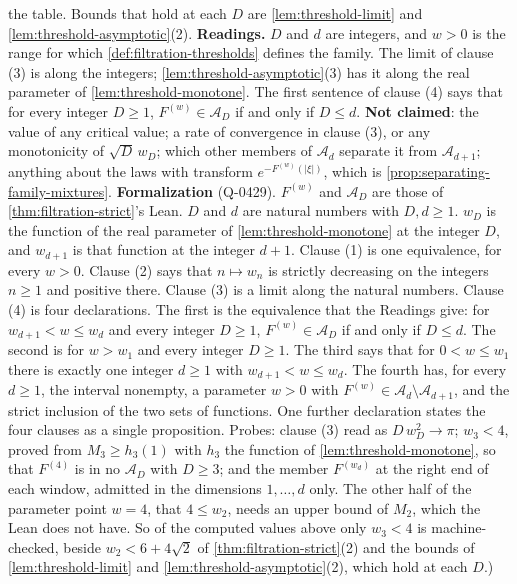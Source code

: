 \begin{theorem}
{the table. Bounds that hold at each $D$ are \ref{lem:threshold-limit} and
\ref{lem:threshold-asymptotic}(2). \textbf{Readings.} $D$ and $d$ are integers, and $w > 0$ is
the range for which \ref{def:filtration-thresholds} defines the family. The limit of clause (3)
is along the integers; \ref{lem:threshold-asymptotic}(3) has it along the real parameter of
\ref{lem:threshold-monotone}. The first sentence of clause (4) says that for every integer
$D \ge 1$, $F^{(w)} \in \mathcal{A}_D$ if and only if $D \le d$. \textbf{Not claimed}: the value
of any critical value; a rate of convergence in clause (3), or any monotonicity of
$\sqrt D\,w_D$; which other members of $\mathcal{A}_d$ separate it from $\mathcal{A}_{d+1}$;
anything about the laws with transform $e^{-F^{(w)}(|\xi|)}$, which is
\ref{prop:separating-family-mixtures}. \textbf{Formalization} (Q-0429). $F^{(w)}$ and
$\mathcal{A}_D$ are those of \ref{thm:filtration-strict}'s Lean. $D$ and $d$ are natural numbers
with $D, d \ge 1$. $w_D$ is the function of the real parameter of \ref{lem:threshold-monotone}
at the integer $D$, and $w_{d+1}$ is that function at the integer $d + 1$. Clause (1) is one
equivalence, for every $w > 0$. Clause (2) says that $n \mapsto w_n$ is strictly decreasing on
the integers $n \ge 1$ and positive there. Clause (3) is a limit along the natural numbers.
Clause (4) is four declarations. The first is the equivalence that the Readings give: for
$w_{d+1} < w \le w_d$ and every integer $D \ge 1$, $F^{(w)} \in \mathcal{A}_D$ if and only if
$D \le d$. The second is for $w > w_1$ and every integer $D \ge 1$. The third says that for
$0 < w \le w_1$ there is exactly one integer $d \ge 1$ with $w_{d+1} < w \le w_d$. The fourth
has, for every $d \ge 1$, the interval nonempty, a parameter $w > 0$ with
$F^{(w)} \in \mathcal{A}_d \setminus \mathcal{A}_{d+1}$, and the strict inclusion of the two sets
of functions. One further declaration states the four clauses as a single proposition. Probes:
clause (3) read as $D\,w_D^2 \to \pi$; $w_3 < 4$, proved from $M_3 \ge h_3(1)$ with $h_3$ the
function of \ref{lem:threshold-monotone}, so that $F^{(4)}$ is in no $\mathcal{A}_D$ with
$D \ge 3$; and the member $F^{(w_d)}$ at the right end of each window, admitted in the
dimensions $1, \dots, d$ only. The other half of the parameter point $w = 4$, that $4 \le w_2$,
needs an upper bound of $M_2$, which the Lean does not have. So of the computed values above
only $w_3 < 4$ is machine-checked, beside $w_2 < 6 + 4\sqrt2$ of \ref{thm:filtration-strict}(2)
and the bounds of \ref{lem:threshold-limit} and \ref{lem:threshold-asymptotic}(2), which hold at
each $D$.)}
\end{theorem}


